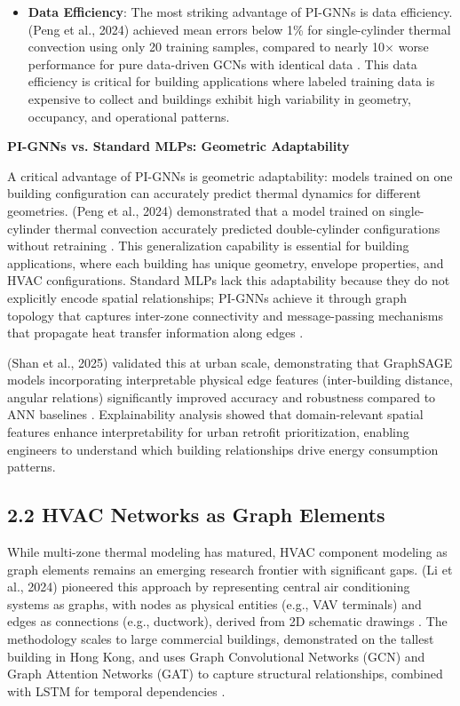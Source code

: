 \documentclass[12pt,a4paper]{article}
\begin{document}
\begin{itemize}
  \item \textbf{Data Efficiency}: The most striking advantage of PI-GNNs is data efficiency. (Peng et al., 2024) achieved mean errors below 1\% for single-cylinder thermal convection using only 20 training samples, compared to nearly 10$\times$ worse performance for pure data-driven GCNs with identical data \cite{ref17}. This data efficiency is critical for building applications where labeled training data is expensive to collect and buildings exhibit high variability in geometry, occupancy, and operational patterns.
\end{itemize}

\textbf{PI-GNNs vs. Standard MLPs: Geometric Adaptability}

A critical advantage of PI-GNNs is geometric adaptability: models trained on one building configuration can accurately predict thermal dynamics for different geometries. (Peng et al., 2024) demonstrated that a model trained on single-cylinder thermal convection accurately predicted double-cylinder configurations without retraining \cite{ref27}. This generalization capability is essential for building applications, where each building has unique geometry, envelope properties, and HVAC configurations. Standard MLPs lack this adaptability because they do not explicitly encode spatial relationships; PI-GNNs achieve it through graph topology that captures inter-zone connectivity and message-passing mechanisms that propagate heat transfer information along edges \cite{ref30}.

(Shan et al., 2025) validated this at urban scale, demonstrating that GraphSAGE models incorporating interpretable physical edge features (inter-building distance, angular relations) significantly improved accuracy and robustness compared to ANN baselines \cite{ref31}. Explainability analysis showed that domain-relevant spatial features enhance interpretability for urban retrofit prioritization, enabling engineers to understand which building relationships drive energy consumption patterns.

\subsection{2.2 HVAC Networks as Graph Elements}

While multi-zone thermal modeling has matured, HVAC component modeling as graph elements remains an emerging research frontier with significant gaps. (Li et al., 2024) pioneered this approach by representing central air conditioning systems as graphs, with nodes as physical entities (e.g., VAV terminals) and edges as connections (e.g., ductwork), derived from 2D schematic drawings \cite{ref32}. The methodology scales to large commercial buildings, demonstrated on the tallest building in Hong Kong, and uses Graph Convolutional Networks (GCN) and Graph Attention Networks (GAT) to capture structural relationships, combined with LSTM for temporal dependencies \cite{ref33}.
\end{document}
